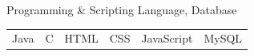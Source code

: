 \documentclass[a4paper,10pt]{article}
\makeatletter
\newlength{\cvcolumngapwidth}
\newlength{\cvleftcolumnwidth}
\newlength{\cvrightcolumnwidth}
\newcommand{\cvheadingstyle}[1]{{\normalsize\cvheadingfont\textcolor{cvheadingcolor}{#1}}}
\newcommand{\cvboldstlye}[1]{{\normalsize\cvboldfont\textcolor{cvboldcolor}{\scalebox{.93}[1.0]{#1}}}}
\newlength{\cvafteritemskipamount}
\newlength{\cvparskip}
\newcommand{\cvitem}[2]{
    \begin{minipage}[t]{\cvleftcolumnwidth}
        \raggedleft #1
    \end{minipage}%
    \hspace{\cvcolumngapwidth}%
    \begin{minipage}[t]{\cvrightcolumnwidth}
        \setlength{\parskip}{\cvparskip} #2
    \end{minipage}

    \vspace{\cvafteritemskipamount}
}
\newcommand*{\skillbar}[1]{%
    \skillb@level=\dimexpr#1\skillb@length/100\relax%
    {\color{cvskilledcolor}\rule{\skillb@level}{\skillb@height}}%
    {\color{cvnoskillcolor}%
        \rule{\dimexpr\skillb@length-\skillb@level\relax}{\skillb@height}}%

}
\makeatother
\begin{document}



\cvitem{
    \cvheadingstyle{Programming \& Scripting Language, Database}
    
}{  
        \setlength\tabcolsep{5pt}
        \begin{tabular}{|l|l|l|l|l|l|}

        Java & C & HTML & CSS & JavaScript & MySQL \\
        \end{tabular}
    
}





    
\end{document}
